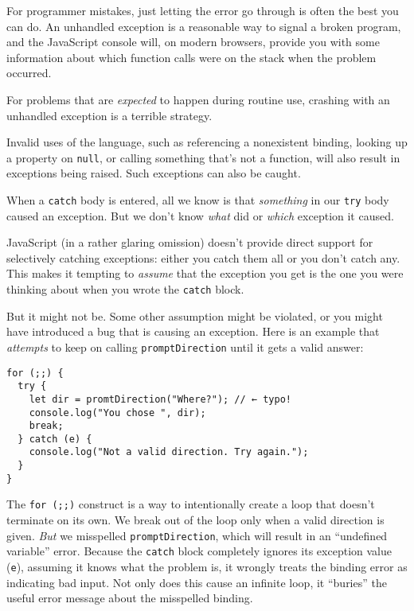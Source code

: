 For programmer mistakes, just letting the error go through is often the best you can do. An unhandled exception is a reasonable way to signal a broken program, and the JavaScript console will, on modern browsers, provide you with some information about which function calls were on the stack when the problem occurred.

For problems that are \emph{expected} to happen during routine use, crashing with an unhandled exception is a terrible strategy.

Invalid uses of the language, such as referencing a nonexistent binding, looking up a property on \lstinline`null`, or calling something that's not a function, will also result in exceptions being raised. Such exceptions can also be caught.

When a \lstinline`catch` body is entered, all we know is that \emph{something} in our \lstinline`try` body caused an exception. But we don't know \emph{what} did or \emph{which} exception it caused.

JavaScript (in a rather glaring omission) doesn't provide direct support for selectively catching exceptions: either you catch them all or you don't catch any. This makes it tempting to \emph{assume} that the exception you get is the one you were thinking about when you wrote the \lstinline`catch` block.

But it might not be. Some other assumption might be violated, or you might have introduced a bug that is causing an exception. Here is an example that \emph{attempts} to keep on calling \lstinline`promptDirection` until it gets a valid answer:

\begin{lstlisting}
for (;;) {
  try {
    let dir = promtDirection("Where?"); // ← typo!
    console.log("You chose ", dir);
    break;
  } catch (e) {
    console.log("Not a valid direction. Try again.");
  }
}
\end{lstlisting}
\noindent{}

The \lstinline`for (;;)` construct is a way to intentionally create a loop that doesn't terminate on its own. We break out of the loop only when a valid direction is given. \emph{But} we misspelled \lstinline`promptDirection`, which will result in an ``undefined variable'' error. Because the \lstinline`catch` block completely ignores its exception value (\lstinline`e`), assuming it knows what the problem is, it wrongly treats the binding error as indicating bad input. Not only does this cause an infinite loop, it ``buries'' the useful error message about the misspelled binding.

